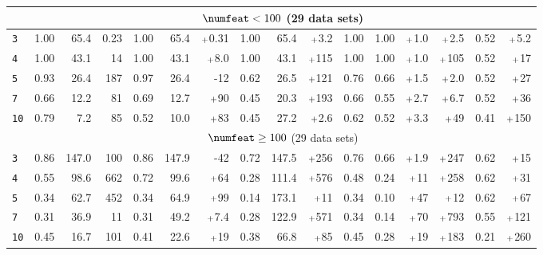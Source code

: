 \begin{tabular}{lrrrrrrrrrrrrrrr}
&\multicolumn{15}{c}{$\numfeat < 100$ (29 data sets)}\\
\midrule
\texttt{3} & 1.00 & 65.4 & 0.23 & 1.00 & 65.4 & $\mathsmaller{+}$0.31 & 1.00 & 65.4 & $\mathsmaller{+}$3.2 & 1.00 & 1.00 & $\mathsmaller{+}$1.0 & $\mathsmaller{+}$2.5 & 0.52 & $\mathsmaller{+}$5.2\\
\texttt{4} & 1.00 & 43.1 & 14 & 1.00 & 43.1 & $\mathsmaller{+}$8.0 & 1.00 & 43.1 & $\mathsmaller{+}$115 & 1.00 & 1.00 & $\mathsmaller{+}$1.0 & $\mathsmaller{+}$105 & 0.52 & $\mathsmaller{+}$17\\
\texttt{5} & 0.93 & 26.4 & 187 & 0.97 & 26.4 & -12 & 0.62 & 26.5 & $\mathsmaller{+}$121 & 0.76 & 0.66 & $\mathsmaller{+}$1.5 & $\mathsmaller{+}$2.0 & 0.52 & $\mathsmaller{+}$27\\
\texttt{7} & 0.66 & 12.2 & 81 & 0.69 & 12.7 & $\mathsmaller{+}$90 & 0.45 & 20.3 & $\mathsmaller{+}$193 & 0.66 & 0.55 & $\mathsmaller{+}$2.7 & $\mathsmaller{+}$6.7 & 0.52 & $\mathsmaller{+}$36\\
\texttt{10} & 0.79 & 7.2 & 85 & 0.52 & 10.0 & $\mathsmaller{+}$83 & 0.45 & 27.2 & $\mathsmaller{+}$2.6 & 0.62 & 0.52 & $\mathsmaller{+}$3.3 & $\mathsmaller{+}$49 & 0.41 & $\mathsmaller{+}$150\\
\midrule
&\multicolumn{15}{c}{$\numfeat \geq 100$ (29 data sets)}\\
\midrule
\texttt{3} & 0.86 & 147.0 & 100 & 0.86 & 147.9 & -42 & 0.72 & 147.5 & $\mathsmaller{+}$256 & 0.76 & 0.66 & $\mathsmaller{+}$1.9 & $\mathsmaller{+}$247 & 0.62 & $\mathsmaller{+}$15\\
\texttt{4} & 0.55 & 98.6 & 662 & 0.72 & 99.6 & $\mathsmaller{+}$64 & 0.28 & 111.4 & $\mathsmaller{+}$576 & 0.48 & 0.24 & $\mathsmaller{+}$11 & $\mathsmaller{+}$258 & 0.62 & $\mathsmaller{+}$31\\
\texttt{5} & 0.34 & 62.7 & 452 & 0.34 & 64.9 & $\mathsmaller{+}$99 & 0.14 & 173.1 & $\mathsmaller{+}$11 & 0.34 & 0.10 & $\mathsmaller{+}$47 & $\mathsmaller{+}$12 & 0.62 & $\mathsmaller{+}$67\\
\texttt{7} & 0.31 & 36.9 & 11 & 0.31 & 49.2 & $\mathsmaller{+}$7.4 & 0.28 & 122.9 & $\mathsmaller{+}$571 & 0.34 & 0.14 & $\mathsmaller{+}$70 & $\mathsmaller{+}$793 & 0.55 & $\mathsmaller{+}$121\\
\texttt{10} & 0.45 & 16.7 & 101 & 0.41 & 22.6 & $\mathsmaller{+}$19 & 0.38 & 66.8 & $\mathsmaller{+}$85 & 0.45 & 0.28 & $\mathsmaller{+}$19 & $\mathsmaller{+}$183 & 0.21 & $\mathsmaller{+}$260\\
\bottomrule
\end{tabular}
